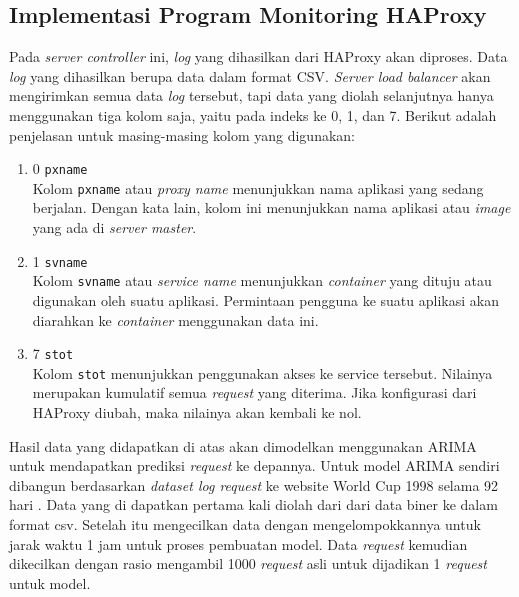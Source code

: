     	\subsection{Implementasi Program Monitoring HAProxy}
        	Pada \textit{server controller} ini, \textit{log} yang dihasilkan dari HAProxy akan diproses. Data \textit{log} yang dihasilkan berupa data dalam format CSV. \textit{Server load balancer} akan mengirimkan semua data \textit{log} tersebut, tapi data yang diolah selanjutnya hanya menggunakan tiga kolom saja, yaitu pada indeks ke 0, 1, dan 7. Berikut adalah penjelasan untuk masing-masing kolom yang digunakan:
            \begin{enumerate}
            \item 0 \texttt{pxname} \\
            	Kolom \texttt{pxname} atau \textit{proxy name} menunjukkan nama aplikasi yang sedang berjalan. Dengan kata lain, kolom ini menunjukkan nama aplikasi atau \textit{image} yang ada di \textit{server master}.
            \item 1 \texttt{svname} \\
            	Kolom \texttt{svname} atau \textit{service name} menunjukkan \textit{container} yang dituju atau digunakan oleh suatu aplikasi. Permintaan pengguna ke suatu aplikasi akan diarahkan ke \textit{container} menggunakan data ini.
     		\item 7 \texttt{stot} \\
            	Kolom \texttt{stot} menunjukkan penggunakan akses ke service tersebut. Nilainya merupakan kumulatif semua \textit{request} yang diterima. Jika konfigurasi dari HAProxy diubah, maka nilainya akan kembali ke nol.
            \end{enumerate}
                      \indent Hasil data yang didapatkan di atas akan dimodelkan menggunakan ARIMA untuk mendapatkan prediksi \textit{request} ke depannya. Untuk model ARIMA sendiri dibangun berdasarkan \textit{dataset log request} ke website World Cup 1998 selama 92 hari \cite{noauthor_1998_nodate}. Data yang di dapatkan pertama kali diolah dari dari data biner ke dalam format csv. Setelah itu mengecilkan data dengan mengelompokkannya untuk jarak waktu 1 jam untuk proses pembuatan model. Data \textit{request} kemudian dikecilkan dengan rasio mengambil 1000 \textit{request} asli untuk dijadikan 1 \textit{request} untuk model. 
            
